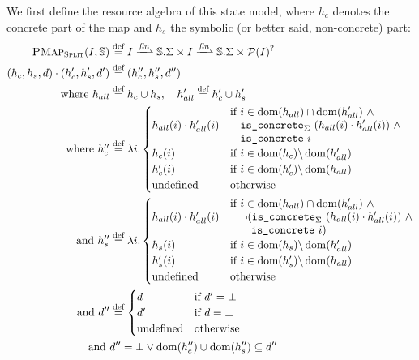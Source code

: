 We first define the resource algebra of this state model, where $h_c$ denotes the concrete part of the map and $h_s$ the symbolic (or better said, non-concrete) part: 
\begin{align*}
	\SplitPMap(I,\mmdl) &\defeq I \finmap \mmdl.\Sigma \times I \finmap\mmdl.\Sigma \times \pset(I)^?\\
	(h_c, h_s, d)\cdot (h_c', h_s', d') &\defeq (h_c'', h_s'', d'')\\
	\text{where } h_{all}&\defeq h_c\cup h_s,\quad h_{all}'\defeq h_c'\cup h_s'\\
	\text{where } h_c''&\defeq \lambda i.\begin{cases}
		h_{all}(i)\cdot h_{all}'(i)&\begin{aligned}
			\If~&i\in \dom(h_{all})\cap\dom(h_{all}') ~\land \\
			&\code{is\_concrete}_\St~(h_{all}(i)\cdot h_{all}'(i)) ~\land \\
			&\code{is\_concrete}~i
		\end{aligned}\\
		h_c(i) &\If~i\in \dom(h_c) \backslash \dom(h_{all}')\\
		h_c'(i) &\If~i\in \dom(h_c') \backslash \dom(h_{all})\\
		\text{undefined}&\Otherwise
	\end{cases}\\
	\text{and }h_s'' &\defeq \lambda i.\begin{cases}
		h_{all}(i)\cdot h_{all}'(i)&\begin{aligned}
			\If~&i\in \dom(h_{all})\cap\dom(h_{all}') ~\land \\
			&\neg(\code{is\_concrete}_\St~(h_{all}(i)\cdot h_{all}'(i)) ~\land \\
			&~~~\code{is\_concrete}~i)
		\end{aligned}\\
		h_s(i) &\If~i\in \dom(h_s) \backslash \dom(h_{all}')\\
		h_s'(i) &\If~i\in \dom(h_s') \backslash \dom(h_{all})\\
		\text{undefined}&\Otherwise
	\end{cases}\\
	\text{and }d''&\defeq\begin{cases}
		d&\If~d'=\bot\\
		d'&\If~d=\bot\\
		\text{undefined}&\Otherwise
	\end{cases}\\
	\text{and }& d'' = \bot \lor \dom(h_c'')\cup\dom(h_s'')\subseteq d''\\

\end{align*}

